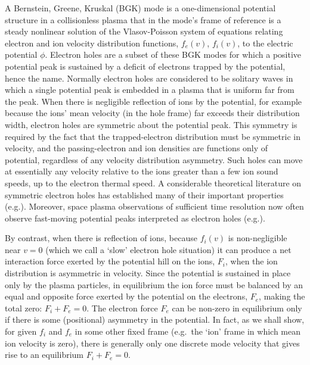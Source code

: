 \documentclass[12pt]{article}
\begin{document}
A Bernstein, Greene, Kruskal\cite{Bernstein1957} (BGK) mode is a
one-dimensional potential structure in a collisionless plasma that in
the mode's frame of reference is a steady nonlinear solution of the
Vlasov-Poisson system of equations relating electron and ion velocity
distribution functions, $f_e(v)$, $f_i(v)$, to the electric potential
$\phi$. Electron holes are a subset of these BGK modes for which a
positive potential peak is sustained by a deficit of electrons trapped
by the potential\cite{Schamel1986,Hutchinson2017}, hence the
name. Normally electron holes are considered to be solitary waves in
which a single potential peak is embedded in a plasma that is uniform
far from the peak. When there is negligible reflection of ions by the
potential, for example because the ions' mean velocity (in the hole
frame) far exceeds their distribution width, electron holes are
symmetric about the potential peak. This symmetry is required by the
fact that the trapped-electron distribution must be symmetric in
velocity, and the passing-electron and ion densities are functions
only of potential, regardless of any velocity distribution
asymmetry. Such holes can move at essentially any velocity relative to
the ions greater than a few ion sound speeds, up to the electron
thermal speed. A considerable theoretical literature on symmetric
electron holes has established many of their important
properties (e.g.\cite{Eliasson2006,Krasovsky2003,Dupree1982,Turikov1984,Chen2004,Ng2006,Hutchinson2018a,Hutchinson2019,Zhou2018,Hutchinson2021b}). Moreover,
space plasma observations of sufficient time resolution now often
observe fast-moving potential peaks interpreted as electron holes (e.g.\cite{Ergun1998,Ergun1999,Malaspina2013,Malaspina2014,Malaspina2018,Malaspina2019,Steinvall2019,Graham2016,Tong2018,Lotekar2020}).

By contrast, when there is reflection of ions, because $f_i(v)$ is
non-negligible near $v=0$ (which we call a `slow' electron hole
situation) it can produce a net interaction force exerted by the
potential hill on the ions, $F_i$, when the ion distribution is
asymmetric in velocity. Since the potential is sustained in place only
by the plasma particles, in equilibrium the ion force must be balanced
by an equal and opposite force exerted by the potential on the
electrons, $F_e$, making the total zero: $F_i+F_e=0$. The electron
force $F_e$ can be non-zero in equilibrium only if there is some
(positional) asymmetry in the potential. In fact, as we shall show,
for given $f_i$ and $f_e$ in some other fixed frame (e.g.\ the `ion'
frame in which mean ion velocity is zero), there is generally only one
discrete mode velocity that gives rise to an equilibrium $F_i+F_e=0$.
\end{document}
